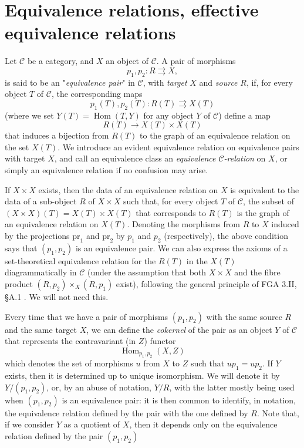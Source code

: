 \section{Equivalence relations, effective equivalence relations}\label{fga3.iii-1}

Let $\mathcal{C}$ be a category, and $X$ an object of $\mathcal{C}$.
A pair of morphisms
\[
    p_1,p_2\colon R\rightrightarrows X,
\]
is said to be an "\emph{equivalence pair}" in $\mathcal{C}$, with \emph{target} $X$ and \emph{source} $R$, if, for every object $T$ of $\mathcal{C}$, the corresponding maps
\[
    p_1(T),p_2(T)\colon R(T)\rightrightarrows X(T)
\]
(where we set $Y(T)=\operatorname{Hom}(T,Y)$ for any object $Y$ of $\mathcal{C}$) define a map
\[
    R(T)\to X(T)\times X(T)
\]
that induces a bijection from $R(T)$ to the graph of an equivalence relation on the set $X(T)$.
We introduce an evident equivalence relation on equivalence pairs with target $X$, and call an equivalence class an \emph{equivalence $\mathcal{C}$-relation} on $X$, or simply an equivalence relation if no confusion may arise.


If $X\times X$ exists, then the data of an equivalence relation on $X$ is equivalent to the data of a sub-object $R$ of $X\times X$ such that, for every object $T$ of $\mathcal{C}$, the subset of $(X\times X)(T)=X(T)\times X(T)$ that corresponds to $R(T)$ is the graph of an equivalence relation on $X(T)$.
Denoting the morphisms from $R$ to $X$ induced by the projections $\mathrm{pr}_1$ and $\mathrm{pr}_2$ by $p_1$ and $p_2$ (respectively), the above condition says that $(p_1,p_2)$ is an equivalence pair.
We can also express the axioms of a set-theoretical equivalence relation for the $R(T)$ in the $X(T)$ diagrammatically in $\mathcal{C}$ (under the assumption that both $X\times X$ and the fibre product $(R,p_2)\times_X(R,p_1)$ exist), following the general principle of FGA 3.II, §A.1 .
We will not need this.

Every time that we have a pair of morphisms $(p_1,p_2)$ with the same source $R$ and the same target $X$, we can define the \emph{cokernel} of the pair as an object $Y$ of $\mathcal{C}$ that represents the contravariant (in $Z$) functor
\[
    \operatorname{Hom}_{p_1,p_2}(X,Z)
\]
which denotes the set of morphisms $u$ from $X$ to $Z$ such that $up_1=up_2$.
If $Y$ exists, then it is determined up to unique isomorphism.
We will denote it by $Y/(p_1,p_2)$, or, by an abuse of notation, $Y/R$, with the latter mostly being used when $(p_1,p_2)$ is an equivalence pair: it is then common to identify, in notation, the equivalence relation defined by the pair with the one defined by $R$.
Note that, if we consider $Y$ as a quotient of $X$, then it depends only on the equivalence relation defined by the pair $(p_1,p_2)$

